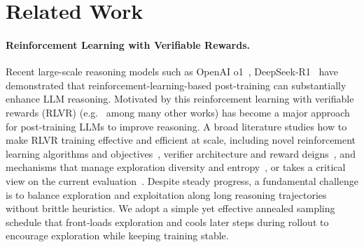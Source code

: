\section{Related Work}
\label{sec: related_work}
\paragraph{Reinforcement Learning with Verifiable Rewards.}  Recent large-scale reasoning models such as OpenAI o1~\citep{openai2024learning}, DeepSeek‑R1~\citep{guo2025deepseek} have demonstrated that reinforcement-learning-based post‑training can substantially enhance LLM reasoning. Motivated by this reinforcement learning with verifiable rewards (RLVR) (e.g.~\citet{shao2024deepseekmath,guo2025deepseek,lambert2024tulu,yang2025qwen3,hu2025open,yu2025dapo,guan2025rstar,zeng2025simplerl} among many other works) has become a major approach for post‑training LLMs to improve reasoning. A broad literature studies how to make RLVR training effective and efficient at scale, including novel reinforcement learning algorithms and objectives~\citep{yu2025dapo,liu2025understanding,yue2025vapo,zheng2025group}, verifier architecture and reward deigns~\citep{zuo2025ttrl,zhao2025learning,agarwal2025unreasonable,prabhudesai2025maximizing}, and mechanisms that manage exploration diversity and entropy~\citep{cheng2025reasoning,chen2025pass,cui2025entropy,wang2025beyond}, or takes a critical view on the current evaluation~\citep{yue2025does,zhao2025echo,hochlehnert2025sober}. Despite steady progress, a fundamental challenge is to balance exploration and exploitation along long reasoning trajectories without brittle heuristics. We adopt a simple yet effective annealed sampling schedule that front‑loads exploration and cools later steps during rollout to encourage exploration while keeping training stable.

